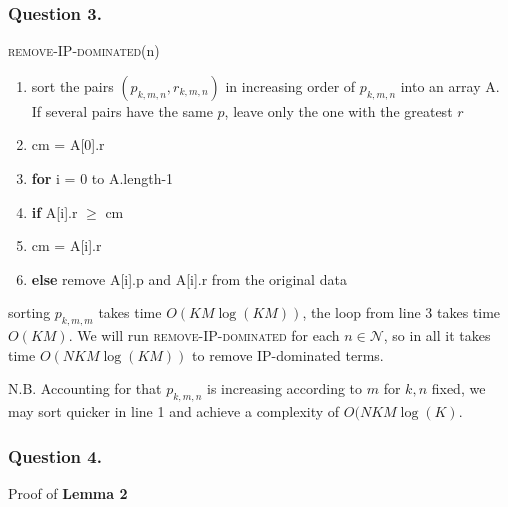 \documentclass[11pt, oneside]{report}
\begin{document}
\subsubsection{Question 3.}
\noindent\textsc{remove-IP-dominated}(n)
\begin{enumerate}[1\ ]
\setlength{\topsep}{0.05ex}
\setlength{\itemsep}{0.05ex}
\item sort the pairs $(p_{k,m,n}, r_{k,m,n})$ in increasing order of $p_{k,m,n}$ into an array A. If several pairs have the same $p$, leave only the one with the greatest $r$
\item cm = A[0].r
\item \textbf{for} i = 0 to A.length-1
\item \qquad \textbf{if} A[i].r $\ge$ cm
\item \qquad \qquad cm = A[i].r
\item \qquad \textbf{else} remove A[i].p and A[i].r from the original data
\end{enumerate}


sorting $p_{k,m,m}$ takes time $O(KM\log(KM))$, the loop from line 3 takes time $O(KM)$. We will run \textsc{remove-IP-dominated} for each $n\in\mathcal{N}$, so in all it takes time $O(NKM\log(KM))$ to remove IP-dominated terms.

\noindent\textsc{N.B.} Accounting for that $p_{k,m,n}$ is increasing according to $m$ for $k,n$ fixed, we may sort quicker in line 1 and achieve a complexity of $O(NKM\log(K)$.

\subsubsection{Question 4.}
Proof of \textbf{Lemma 2}
\end{document}
